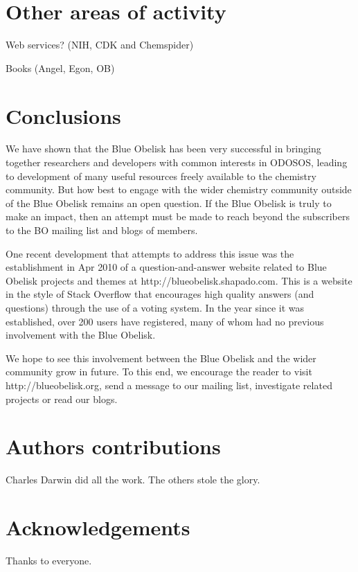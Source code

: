 \documentclass[10pt]{bmc_article}
\newenvironment{bmcformat}{\begin{raggedright}\baselineskip20pt\sloppy\setboolean{publ}{false}}{\end{raggedright}\baselineskip20pt\sloppy}
\begin{document}
\begin{bmcformat}
\section*{Other areas of activity}
Web services? (NIH, CDK and Chemspider)

Books (Angel, Egon, OB)

\section*{Conclusions}

We have shown that the Blue Obelisk has been very successful
in bringing together researchers and developers with common interests
in ODOSOS, leading to development of many useful resources freely
available to the chemistry community. But how best to engage with the
wider chemistry community outside of the Blue Obelisk remains an open
question. If the Blue Obelisk is truly to make an impact,
then an attempt must be made to reach beyond the subscribers to the
BO mailing list and blogs of members.

One recent development
that attempts to address this issue was the establishment in Apr 2010 of a
question-and-answer
website related to Blue Obelisk projects and themes at
http://blueobelisk.shapado.com. This is a website in the
style of Stack Overflow that encourages high quality answers (and
questions) through the use of a voting system. In the year since it
was established, over
200 users have registered, many of whom had no previous involvement
with the Blue Obelisk.

We hope to see this involvement between the Blue Obelisk and the wider
community grow in future. To this end, we encourage the reader to
visit http://blueobelisk.org, send a message to our mailing list,
investigate related projects or read our blogs.


\section*{Authors contributions}
   Charles Darwin did all the work. The others stole the glory. 
    

\section*{Acknowledgements}
  Thanks to everyone.



\end{bmcformat}
\end{document}
